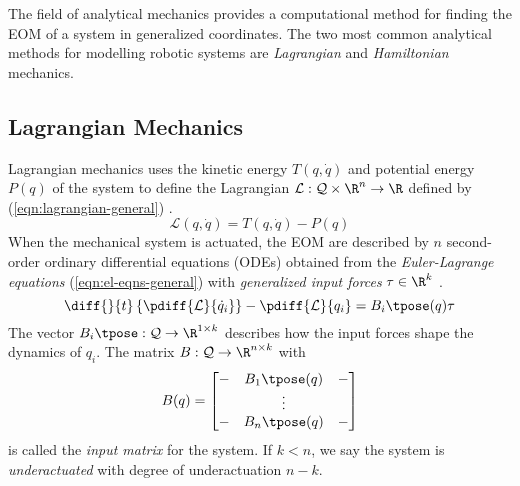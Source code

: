 The field of analytical mechanics provides a computational method for finding
the EOM of a system in generalized coordinates. The two most common analytical
methods for modelling robotic systems are \textit{Lagrangian} and
\textit{Hamiltonian} mechanics.

\subsection{Lagrangian Mechanics}\label{sec:lagrangian-mechanics}

Lagrangian mechanics uses the kinetic energy \(T(q,\dot{q})\) and potential
energy \(P(q)\) of the system to define the Lagrangian 
\(\mathcal{L} : \mathcal{Q}\times\R^n \rightarrow \R\) defined by
(\ref{eqn:lagrangian-general}) \cite{greenwood_dynamics}.
\begin{equation}\label{eqn:lagrangian-general}
    \mathcal{L}(q,\dot{q}) = T(q,\dot{q}) - P(q)
\end{equation}
When the mechanical system is actuated, the EOM are described by \(n\) second-order
ordinary differential equations (ODEs) obtained from the \textit{Euler-Lagrange
equations} (\ref{eqn:el-eqns-general}) with \textit{generalized input forces} 
\(\tau \in \R^k\) . 
\begin{equation}\label{eqn:el-eqns-general}
    \diff{}{t}\left\{ \pdiff{\mathcal{L}}{\dot{q}_i} \right\}
    - \pdiff{\mathcal{L}}{q_i} = B_i\tpose(q) \tau
\end{equation}
The vector \(B_i\tpose: \mathcal{Q} \rightarrow \R^{1\times k}\) describes how
the input forces shape the dynamics of \(q_i\).
The matrix  \(B: \mathcal{Q} \rightarrow \R^{n \times k}\) with
\[
    B(q) = \begin{bmatrix}
        - & B_1\tpose(q) & - \\
          & \vdots & \\
        - & B_n\tpose(q) & - \\
    \end{bmatrix}
\]
is called the \textit{input matrix} for the system.
If \(k < n\), we say the system is \textit{underactuated} with degree of
underactuation \(n - k\).

